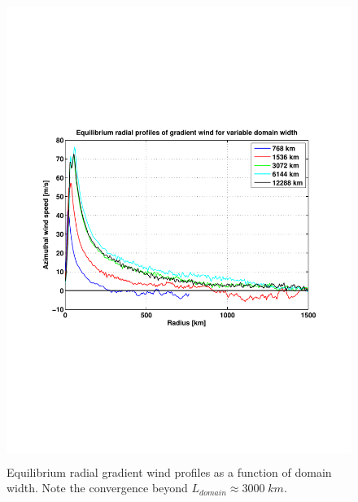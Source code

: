 \documentclass[12pt]{article}
\begin{document}
\begin{figure}[h!]
\centering
  \noindent\includegraphics[width=15cm,height=15cm]{FIGURES/Domain_size.pdf}
\caption{Equilibrium radial gradient wind profiles as a function of domain width.  Note the convergence beyond $L_{domain} \approx 3000 \; km$.}
\label{fig:domainsize}
\end{figure}
\end{document}
